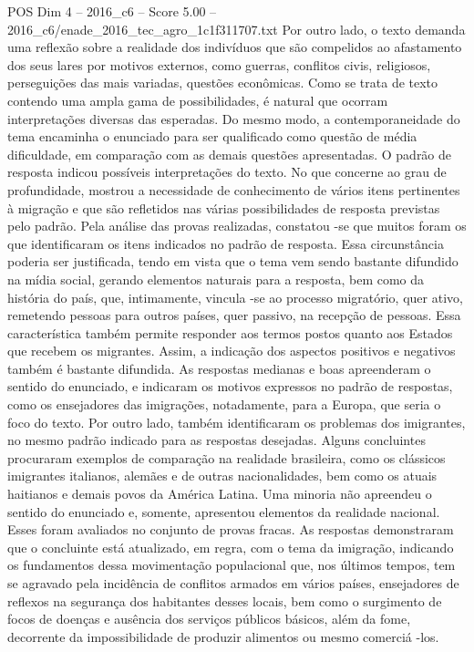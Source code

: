 \begin{textsample}{POS Dim 4 – 2016\_c6 – Score 5.00 – 2016\_c6/enade\_2016\_tec\_agro\_1c1f311707.txt}
Por outro lado, o texto demanda uma reflexão sobre a realidade dos indivíduos que são compelidos ao afastamento dos seus lares por motivos externos, como guerras, conflitos civis, religiosos, perseguições das mais variadas, questões econômicas.
Como se trata de texto contendo uma ampla gama de possibilidades, é natural que ocorram interpretações diversas das esperadas.
Do mesmo modo, a contemporaneidade do tema encaminha o enunciado para ser qualificado como questão de média dificuldade, em comparação com as demais questões apresentadas.
O padrão de resposta indicou possíveis interpretações do texto.
No que concerne ao grau de profundidade, mostrou a necessidade de conhecimento de vários itens pertinentes à migração e que são refletidos nas várias possibilidades de resposta previstas pelo padrão.
Pela análise das provas realizadas, constatou -se que muitos foram os que identificaram os itens indicados no padrão de resposta.
Essa circunstância poderia ser justificada, tendo em vista que o tema vem sendo bastante difundido na mídia social, gerando elementos naturais para a resposta, bem como da história do país, que, intimamente, vincula -se ao processo migratório, quer ativo, remetendo pessoas para outros países, quer passivo, na recepção de pessoas.
Essa característica também permite responder aos termos postos quanto aos Estados que recebem os migrantes.
Assim, a indicação dos aspectos positivos e negativos também é bastante difundida.
As respostas medianas e boas apreenderam o sentido do enunciado, e indicaram os motivos expressos no padrão de respostas, como os ensejadores das imigrações, notadamente, para a Europa, que seria o foco do texto.
Por outro lado, também identificaram os problemas dos imigrantes, no mesmo padrão indicado para as respostas desejadas.
Alguns concluintes procuraram exemplos de comparação na realidade brasileira, como os clássicos imigrantes italianos, alemães e de outras nacionalidades, bem como os atuais haitianos e demais povos da América Latina.
Uma minoria não apreendeu o sentido do enunciado e, somente, apresentou elementos da realidade nacional.
Esses foram avaliados no conjunto de provas fracas.
As respostas demonstraram que o concluinte está atualizado, em regra, com o tema da imigração, indicando os fundamentos dessa movimentação populacional que, nos últimos tempos, tem se agravado pela incidência de conflitos armados em vários países, ensejadores de reflexos na segurança dos habitantes desses locais, bem como o surgimento de focos de doenças e ausência dos serviços públicos básicos, além da fome, decorrente da impossibilidade de produzir alimentos ou mesmo comerciá -los.

\end{textsample}
